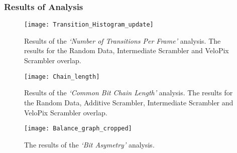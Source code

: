 		\subsubsection{Results of Analysis}
		\label{subsub:algorithm_results}
			\begin{SCfigure}%
				\centering
				\texttt{[image: Transition\_Histogram\_update]}
				\caption{Results of the \textit{`Number of Transitions Per Frame'} analysis. The results for the Random Data, Intermediate Scrambler and VeloPix Scrambler overlap.}
				\label{fig:transitions_per_frame}
			\end{SCfigure}
			\par
			\begin{SCfigure}%
				\centering
				\texttt{[image: Chain\_length]}
				\caption{Results of the \textit{`Common Bit Chain Length'} analysis. The results for the Random Data, Additive Scrambler, Intermediate Scrambler and VeloPix Scrambler overlap.}
				\label{fig:chain_length}
			\end{SCfigure}
			\par
			\begin{figure}[ht]
				\centering
				\texttt{[image: Balance\_graph\_cropped]}
				\caption{The results of the \textit{`Bit Asymetry'} analysis.}
				\label{fig:bit_asym}
			\end{figure}

